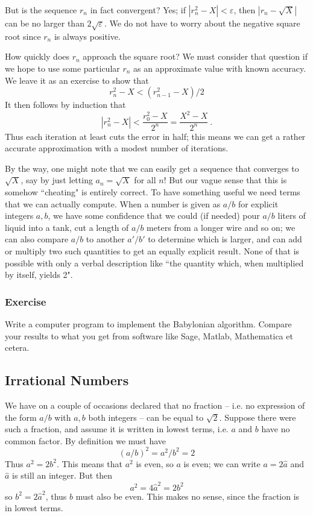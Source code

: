 But is the sequence $r_n$ in fact convergent? Yes; if $|r_n^2 - X| < \varepsilon$, then $|r_n-\sqrt{X}|$ can be no larger than $2\sqrt{\varepsilon}$. We do not have to worry about the negative square root since $r_n$ is always positive.%

How quickly does $r_n$ approach the square root? We must consider that question if we hope to use some particular $r_n$ as an approximate value with known accuracy. We leave it as an exercise to show that
\[
r_n^2 - X < (r_{n-1}^2 - X)/2
\]
It then follows by induction that
\[
|r_n^2 - X| < \frac{r_0^2-X}{2^n} = \frac{X^2-X}{2^n}\ .
\]
Thus each iteration at least cuts the error in half; this means we can get a rather accurate approximation with a modest number of iterations.

By the way, one might note that we can easily get a sequence that converges to $\sqrt{X}$, say by just letting $a_n = \sqrt{X}$ for all $n$! But our vague sense that this is somehow ``cheating" is entirely correct. To have something useful we need terms that we can actually compute. When a number is given as $a/b$ for explicit integers $a,b$, we have some confidence that we could (if needed) pour $a/b$ liters of liquid into a tank, cut a length of $a/b$ meters from a longer wire and so on; we can also compare $a/b$ to another $a'/b'$ to determine which is larger, and can add or multiply two such quantities to get an equally explicit result. None of that is possible with only a verbal description like ``the quantity which, when multiplied by itself, yields 2". 


\subsubsection{Exercise}
Write a computer program to implement the Babylonian algorithm. Compare your results to what you get from software like Sage, Matlab, Mathematica et cetera.


\subsection{Irrational Numbers}\label{sec:sqrtIrrational}
We have on a couple of occasions declared that no fraction -- i.e. no expression of the form $a/b$ with $a,b$ both integers -- can be equal to $\sqrt{2}$. Suppose there were such a fraction, and assume it is written in lowest terms, i.e. $a$ and $b$ have no common factor. By definition we must have
\[
(a/b)^2 = a^2/b^2 =2
\]
Thus $a^2 = 2b^2$. This means that $a^2$ is even, so $a$ is even; we can write $a=2\hat{a}$ and $\hat{a}$ is still an integer. But then
\[
a^2 = 4\hat{a}^2 = 2b^2
\]
so $b^2 = 2\hat{a}^2$, thus $b$ must also be even. This makes no sense, since the fraction is in lowest terms.

